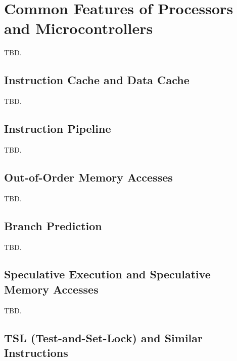\section{Common Features of Processors and Microcontrollers}
\label{scfp0}

TBD.


\subsection{Instruction Cache and Data Cache}
\label{scfp0:sicd0}

TBD.


\subsection{Instruction Pipeline}
\label{scfp0:spip0}

TBD.


\subsection{Out-of-Order Memory Accesses}
\label{scfp0:soom0}

TBD.


\subsection{Branch Prediction}
\label{scfp0:sbpd0}

TBD.


\subsection{Speculative Execution and Speculative Memory Accesses}
\label{scfp0:soom0}

TBD.


\subsection{TSL (Test-and-Set-Lock) and Similar Instructions}
\label{scfp0:stsl0}

